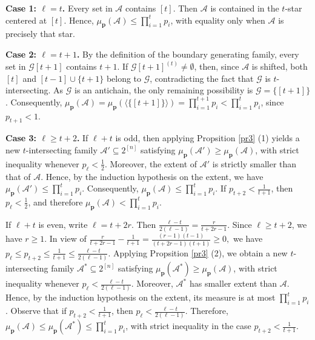 \documentclass[11pt]{article}
\begin{document}
\medskip
\textbf{Case 1: $\ell=t$.} 
Every set in $\mathcal{A}$ contains $[t]$. Then  $\mathcal{A}$ is contained in the $t$-star centered at $[t]$. Hence, $\mu_{\mathbf{p}}(\mathcal{A})\le \prod_{i=1}^t p_i$, with equality only when $\mathcal{A}$ is precisely that star.

\medskip
\textbf{Case 2: $\ell=t+1$.} 
By the definition of the boundary generating family, every set in $\mathcal{G}[t+1]$ contains $t+1$. If $\mathcal{G}[t+1]^{(t)}\neq \emptyset$, then, since  $\mathcal{A}$  is  shifted,  both  $[t]$ and $ [t-1]\cup \{t+1\}$ belong to $\mathcal{G}$, contradicting the fact that $\mathcal{G}$
is $t$-intersecting. As $\mathcal{G}$ is an antichain, the only remaining  possibility is $\mathcal{G}=\{[t+1]\}$. Consequently,  $\mu_{\mathbf{p}}(\mathcal{A})=\mu_{\mathbf{p}}(\langle \{[t+1]\} \rangle)= \prod_{i=1}^{t+1} p_i< \prod_{i=1}^t p_i$, since $p_{t+1}<1$.



\medskip
\textbf{Case 3: $\ell\ge t+2$.} 
If $\ell+t$ is odd, then applying Propsition \ref{pr3} (1)  yields a new $t$-intersecting family $\mathcal{A}'\subseteq 2^{[n]}$ satisfying
$\mu_{\mathbf{p}}(\mathcal{A}')\ge \mu_{\mathbf{p}}(\mathcal{A})$,
with  strict inequality  whenever $p_{\ell}<\frac{1}{2}$. Moreover, the extent of $\mathcal{A}'$  is strictly smaller  than  that of $\mathcal{A}$. Hence, by the induction hypothesis on the extent, we have $\mu_\textbf{p}(\mathcal{A}') \leq\prod_{i=1}^t p_i$. Consequently, $
\mu_\textbf{p}(\mathcal{A}) \le \prod_{i=1}^t p_i.
$
If $p_{t+2}  < \frac{1}{t+1}$, then $p_{\ell}<\frac{1}{2}$,
and therefore $
\mu_\textbf{p}(\mathcal{A}) < \prod_{i=1}^t p_i.
$

If $\ell+t$ is even, write $\ell=t+2r$. Then  $\frac{\ell-t}{2(\ell-1)}=\frac{r}{t+2r-1}$. Since  $\ell\ge t+2$, we have $r\geq 1$.
In view of
$
\frac{r}{t+2r-1}-\frac{1}{t+1}=\frac{(r-1)(t-1)}{(t+2r-1)(t+1)}\geq 0,
$
we have  $p_\ell\le p_{t+2} \leq \frac{1}{t+1}\leq \frac{\ell-t}{2(\ell-1)}$.
Applying Propsition \ref{pr3} (2), 
we obtain a new $t$-intersecting family $\mathcal{A}^*\subseteq 2^{[n]}$ satisfying
$\mu_{\mathbf{p}}(\mathcal{A}^*)\ge \mu_{\mathbf{p}}(\mathcal{A})$,
with  strict inequality  whenever $p_{\ell}<\frac{\ell-t}{2(\ell-1)}$. Moreover, $\mathcal{A}^*$  has smaller extent than $\mathcal{A}$. Hence, by the induction hypothesis on the extent, its measure is at most $\prod_{i=1}^t p_i$. 
Observe that if $p_{t+2}  < \frac{1}{t+1}$, then $p_{\ell}<\frac{\ell-t}{2(\ell-1)}$.
Therefore, $\mu_{\mathbf{p}}(\mathcal{A})\le \mu_{\mathbf{p}}(\mathcal{A}^*)\le \prod_{i=1}^t p_i$, with strict inequality in the case $p_{t+2}  < \frac{1}{t+1}$.
\end{document}
